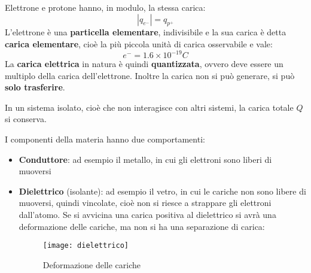 \documentclass[a4paper]{article}
\begin{document}
Elettrone e protone hanno, in modulo, la stessa carica:
\[
  |q_{e^{-}}| = q_{p^{+}}
\] 
L'elettrone è una \textbf{particella elementare}, indivisibile e la sua carica è detta
\textbf{carica elementare}, cioè la più piccola unità di carica osservabile e vale:
\[
  e^- = 1.6 \times 10^{-19}C
\] 
La \textbf{carica elettrica} in natura è quindi \textbf{quantizzata}, ovvero deve
essere un multiplo della carica dell'elettrone. Inoltre la carica non si può generare,
si può \textbf{solo trasferire}.

\begin{definition}
  In un sistema isolato, cioè che non interagisce con altri sistemi, la carica totale 
  \( Q \) si conserva.
\end{definition}

\noindent
I componenti della materia hanno due comportamenti:
\begin{itemize}
  \item \textbf{Conduttore}: ad esempio il metallo, in cui gli elettroni sono liberi di
    muoversi
  \item \textbf{Dielettrico} (isolante): ad esempio il vetro, in cui le cariche non sono
    libere di muoversi, quindi vincolate, cioè non si riesce a strappare gli elettroni
    dall'atomo. Se si avvicina una carica positiva al dielettrico si avrà una deformazione
    delle cariche, ma non si ha una separazione di carica:
    \begin{figure}[H]
      \centering
      \texttt{[image: dielettrico]}
      \caption{Deformazione delle cariche}
    \end{figure}
    
\end{itemize}
\end{document}
